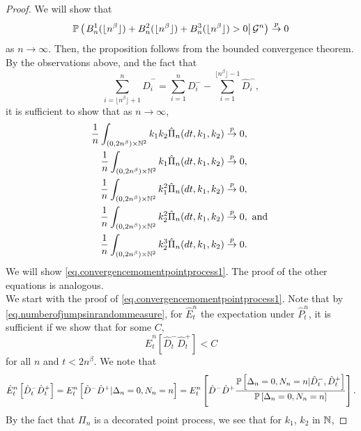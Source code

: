 \begin{proof}
We will show that \begin{equation}\label{eq.conditionalprobanamolousedges}\P\left(\left.B^1_n(\lfloor n^\beta \rfloor)+B^2_n(\lfloor n^\beta \rfloor)+B^3_n(\lfloor n^\beta \rfloor)>0\right| \cG^n \right)\overset{p}{\to}0\end{equation} as $n\to\infty$. Then, the proposition follows from the bounded convergence theorem. By the observations above, and the fact that $$\sum_{i=\lfloor n^\beta \rfloor+1}^n \hat{D}^-_i=\sum_{i=1}^n D^-_i-\sum_{i=1}^{\lfloor n^\beta \rfloor -1}\hat{D}^-_i,$$ it is sufficient to show that as $n\to \infty$,
\begin{align}
\frac{1}{n}\int_{(0,2n^\beta)\times \N^2}k_1k_2\hat{\Pi}_n(dt,k_1,k_2)&\overset{p}{\to}0,\label{eq.convergencemomentpointprocess1}\\
\frac{1}{n}\int_{(0,2n^\beta)\times \N^2}k_1\hat{\Pi}_n(dt,k_1,k_2)&\overset{p}{\to}0,\label{eq.convergencemomentpointprocess2}\\
\frac{1}{n}\int_{(0,2n^\beta)\times \N^2}k_1^2\hat{\Pi}_n(dt,k_1,k_2)&\overset{p}{\to}0,\label{eq.convergencemomentpointprocess3}\\
\frac{1}{n}\int_{(0,2n^\beta)\times \N^2}k_2^2\hat{\Pi}_n(dt,k_1,k_2)&\overset{p}{\to}0,\text{ and }\label{eq.convergencemomentpointprocess4}\\
\frac{1}{n}\int_{(0,2n^\beta)\times \N^2}k_2^3\hat{\Pi}_n(dt,k_1,k_2)&\overset{p}{\to}0.\label{eq.convergencemomentpointprocess5}\end{align}
We will show \ref{eq.convergencemomentpointprocess1}. The proof of the other equations is analogous. \\
We start with the proof of \ref{eq.convergencemomentpointprocess1}. Note that by \eqref{eq.numberofjumpsinrandommeasure}, for $\hat{E}^n_t$ the expectation under $\hat{P}^n_t$, it is sufficient if we show that for some $C$,
\begin{equation}\label{eq.expectationtobound}{\hat{E}}^n_t\left[\hat{D}^-_t\hat{D}^+_t\right]
<C\end{equation}
for all $n$ and $t<2n^\beta$. We note that
$${\hat{E}}^n_t\left[\hat{D}^-_t\hat{D}^+_t\right]={E}^n_t\left[\hat{D}^-\hat{D}^+| \Delta_n=0, N_n=n\right]={E}^n_t\left[\hat{D}^-\hat{D}^+\frac{\P\left[ \Delta_n=0, N_n=n | \hat{D}^-_t,\hat{D}^+_t\right]}{\P\left[ \Delta_n=0, N_n=n\right]}\right].$$
By the fact that $\Pi_n$ is a decorated point process, we see that for $k_1$, $k_2$ in $\N$, 

\end{proof}
